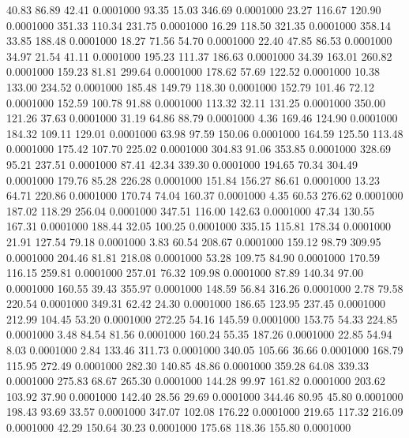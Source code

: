  40.83   86.89   42.41   0.0001000
  93.35   15.03  346.69   0.0001000
  23.27  116.67  120.90   0.0001000
 351.33  110.34  231.75   0.0001000
  16.29  118.50  321.35   0.0001000
 358.14   33.85  188.48   0.0001000
  18.27   71.56   54.70   0.0001000
  22.40   47.85   86.53   0.0001000
  34.97   21.54   41.11   0.0001000
 195.23  111.37  186.63   0.0001000
  34.39  163.01  260.82   0.0001000
 159.23   81.81  299.64   0.0001000
 178.62   57.69  122.52   0.0001000
  10.38  133.00  234.52   0.0001000
 185.48  149.79  118.30   0.0001000
 152.79  101.46   72.12   0.0001000
 152.59  100.78   91.88   0.0001000
 113.32   32.11  131.25   0.0001000
 350.00  121.26   37.63   0.0001000
  31.19   64.86   88.79   0.0001000
   4.36  169.46  124.90   0.0001000
 184.32  109.11  129.01   0.0001000
  63.98   97.59  150.06   0.0001000
 164.59  125.50  113.48   0.0001000
 175.42  107.70  225.02   0.0001000
 304.83   91.06  353.85   0.0001000
 328.69   95.21  237.51   0.0001000
  87.41   42.34  339.30   0.0001000
 194.65   70.34  304.49   0.0001000
 179.76   85.28  226.28   0.0001000
 151.84  156.27   86.61   0.0001000
  13.23   64.71  220.86   0.0001000
 170.74   74.04  160.37   0.0001000
   4.35   60.53  276.62   0.0001000
 187.02  118.29  256.04   0.0001000
 347.51  116.00  142.63   0.0001000
  47.34  130.55  167.31   0.0001000
 188.44   32.05  100.25   0.0001000
 335.15  115.81  178.34   0.0001000
  21.91  127.54   79.18   0.0001000
   3.83   60.54  208.67   0.0001000
 159.12   98.79  309.95   0.0001000
 204.46   81.81  218.08   0.0001000
  53.28  109.75   84.90   0.0001000
 170.59  116.15  259.81   0.0001000
 257.01   76.32  109.98   0.0001000
  87.89  140.34   97.00   0.0001000
 160.55   39.43  355.97   0.0001000
 148.59   56.84  316.26   0.0001000
   2.78   79.58  220.54   0.0001000
 349.31   62.42   24.30   0.0001000
 186.65  123.95  237.45   0.0001000
 212.99  104.45   53.20   0.0001000
 272.25   54.16  145.59   0.0001000
 153.75   54.33  224.85   0.0001000
   3.48   84.54   81.56   0.0001000
 160.24   55.35  187.26   0.0001000
  22.85   54.94    8.03   0.0001000
   2.84  133.46  311.73   0.0001000
 340.05  105.66   36.66   0.0001000
 168.79  115.95  272.49   0.0001000
 282.30  140.85   48.86   0.0001000
 359.28   64.08  339.33   0.0001000
 275.83   68.67  265.30   0.0001000
 144.28   99.97  161.82   0.0001000
 203.62  103.92   37.90   0.0001000
 142.40   28.56   29.69   0.0001000
 344.46   80.95   45.80   0.0001000
 198.43   93.69   33.57   0.0001000
 347.07  102.08  176.22   0.0001000
 219.65  117.32  216.09   0.0001000
  42.29  150.64   30.23   0.0001000
 175.68  118.36  155.80   0.0001000
